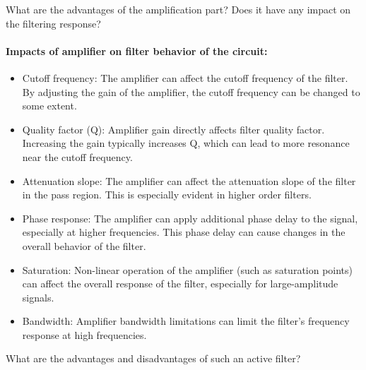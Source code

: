 \documentclass[11pt]{article}
\begin{document}
\begin{question}
\begin{subquestion}{What are the advantages of the amplification part? Does it have any impact on the filtering response?}
{            \paragraph*{Impacts of amplifier on filter behavior of the circuit:}
            \begin{itemize}
                \item Cutoff frequency: The amplifier can affect the cutoff frequency of the filter. By adjusting the gain of the amplifier, the cutoff frequency can be changed to some extent.
                \item Quality factor (Q): Amplifier gain directly affects filter quality factor. Increasing the gain typically increases Q, which can lead to more resonance near the cutoff frequency.
                \item Attenuation slope: The amplifier can affect the attenuation slope of the filter in the pass region. This is especially evident in higher order filters.
                \item Phase response: The amplifier can apply additional phase delay to the signal, especially at higher frequencies. This phase delay can cause changes in the overall behavior of the filter.
                \item Saturation: Non-linear operation of the amplifier (such as saturation points) can affect the overall response of the filter, especially for large-amplitude signals.
                \item Bandwidth: Amplifier bandwidth limitations can limit the filter's frequency response at high frequencies.
            \end{itemize}
        }
    \end{subquestion}
    \begin{subquestion}{What are the advantages and disadvantages of such an active filter?}
\end{subquestion}
\end{question}
\end{document}
